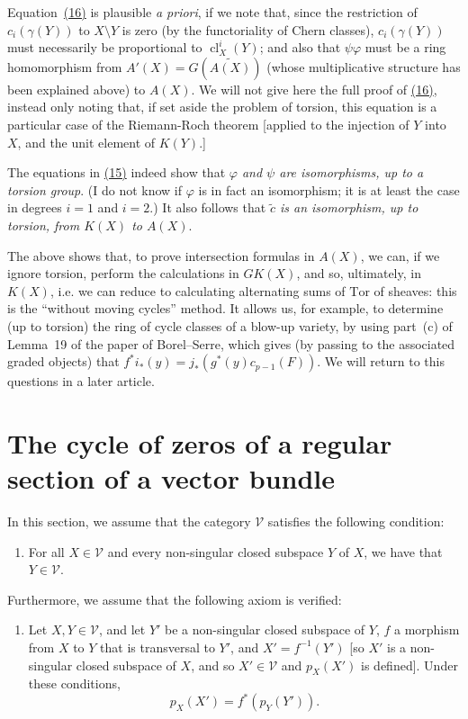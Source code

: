 \documentclass{article}
\renewcommand{\cal}[1]{{\mathcal{#1}}}
\DeclareMathOperator{\cl}{cl}
\begin{document}
\begin{enumerate}
    Equation~\hyperref[equation16]{(16)} is plausible \emph{a priori}, if we note that, since the restriction of $c_i(\gamma(Y))$ to $X\setminus Y$ is zero (by the functoriality of Chern classes), $c_i(\gamma(Y))$ must necessarily be proportional to $\cl_X^i(Y)$;
    and also that $\psi\varphi$ must be a ring homomorphism from $A'(X)=G(\widetilde{A(X)})$ (whose multiplicative structure has been explained above) to $A(X)$.
    We will not give here the full proof of \hyperref[equation16]{(16)}, instead only noting that, if set aside the problem of torsion, this equation is a particular case of the Riemann-Roch theorem [applied to the injection of $Y$ into $X$, and the unit element of $K(Y)$.]

    The equations in \hyperref[equation15]{(15)} indeed show that \emph{$\varphi$ and $\psi$ are isomorphisms, up to a torsion group}.
    (I do not know if $\varphi$ is in fact an isomorphism;
    it is at least the case in degrees $i=1$ and $i=2$.)
    It also follows that \emph{$\widetilde{c}$ is an isomorphism, up to torsion, from $K(X)$ to $A(X)$}.

    The above shows that, to prove intersection formulas in $A(X)$, we can, if we ignore torsion, perform the calculations in $GK(X)$, and so, ultimately, in $K(X)$, i.e. we can reduce to calculating alternating sums of $\mathrm{Tor}$ of sheaves:
    this is the ``without moving cycles'' method.
    It allows us, for example, to determine (up to torsion) the ring of cycle classes of a blow-up variety, by using part~(c) of Lemma~19 of the paper of Borel--Serre, which gives (by passing to the associated graded objects) that $f^*i_*(y) = j_*(g^*(y)c_{p-1}(F))$.
    We will return to this questions in a later article.
\end{enumerate}


\section{The cycle of zeros of a regular section of a vector bundle}
\label{section5}

In this section, we assume that the category $\cal{V}$ satisfies the following condition:
\begin{enumerate}[({V}2)]
  \item\label{axiomV2}
    For all $X\in\cal{V}$ and every non-singular closed subspace $Y$ of $X$, we have that $Y\in\cal{V}$.
\end{enumerate}

Furthermore, we assume that the following axiom is verified:
\begin{enumerate}[({A}5)]
  \item\label{axiomA5}
    Let $X,Y\in\cal{V}$, and let $Y'$ be a non-singular closed subspace of $Y$, $f$ a morphism from $X$ to $Y$ that is transversal to $Y'$, and $X'=f^{-1}(Y')$ [so $X'$ is a non-singular closed subspace of $X$, and so $X'\in\cal{V}$ and $p_X(X')$ is defined].
    Under these conditions,
    \[
      p_X(X') = f^*(p_Y(Y')).
    \]
\end{enumerate}
\end{document}
